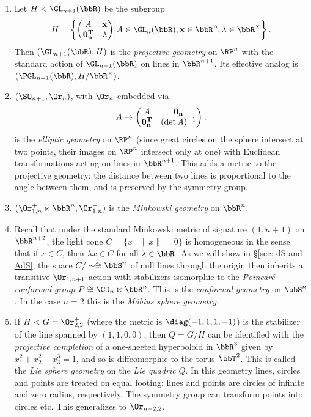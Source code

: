 \begin{example}
\begin{enumerate}
        \item Let $H<\GL_{n+1}(\bbR)$ be the subgroup
        \[H=\left\{\begin{pmatrix}
            A& \bf{x}\\ \bf{0}_n^T &\lambda
        \end{pmatrix}
        \middle| A\in\GL_n(\bbR),\bf{x}\in\bbR^n,\lambda\in \bbR^\times \right\}.\]
        Then $(\GL_{n+1}(\bbR),H)$ is the \emph{projective geometry} on $\RP^n$ with the standard action of $\GL_{n+1}(\bbR)$ on lines in $\bbR^{n+1}$. Its effective analog is $(\PGL_{n+1}(\bbR),H\slash \bbR^\times)$.
        
        \item $(\SO_{n+1},\Or_n)$, with $\Or_n$ embedded via
        \[A\mapsto \begin{pmatrix}
            A& \bf{0}_n\\\bf{0}_n^T & (\det A)^{-1}
        \end{pmatrix},\]
        is the \emph{elliptic geometry} on $\RP^n$ (since great circles on the sphere intersect at two points, their images on $\RP^n$ intersect only at one) with Euclidean transformations acting on lines in $\bbR^{n+1}$. This adds a metric to the projective geometry: the distance between two lines is proportional to the angle between them, and is preserved by the symmetry group.

        \item $(\Or_{1,n}^+\ltimes\bbR^n,\Or_{1,n}^+)$ is the \emph{Minkowski geometry} on $\bbR^n$.

        \item Recall that under the standard Minkowski metric of signature $(1,n+1)$ on $\bbR^{n+2}$, the light cone $C=\{x\mid \lVert x\rVert=0\}$ is homogeneous in the sense that if $x\in C$, then $\lambda x\in C$ for all $\lambda\in\bbR$. As we will show in \S\ref{sec: dS and AdS}, the space $C\slash \sim\cong\bbS^n$ of null lines through the origin then inherits a transitive $\Or_{1,n+1}$-action with stabilizers isomorphic to the \emph{Poincar\'e conformal group} $P\cong \CO_n\ltimes \bbR^n$. This is the \emph{conformal geometry} on $\bbS^n$. In the case $n=2$ this is the \emph{M\"obius sphere geometry}.

        \item If $H<G=\Or_{2,2}^+$ (where the metric is $\diag(-1,1,1,-1)$) is the stabilizer of the line spanned by $(1,1,0,0)$, then $Q=G\slash H$ can be identified with the \emph{projective completion} of a one-sheeted hyperboloid in $\bbR^3$ given by $x_1^2+x_2^2-x_3^3=1$, and so is diffeomorphic to the torus $\bbT^2$. This is called the \emph{Lie sphere geometry} on the \emph{Lie quadric} $Q$. In this geometry lines, circles and points are treated on equal footing: lines and points are circles of infinite and zero radius, respectively. The symmetry group can transform points into circles etc. This generalizes to $\Or_{n+2,2}$.


\end{enumerate}
\end{example}
